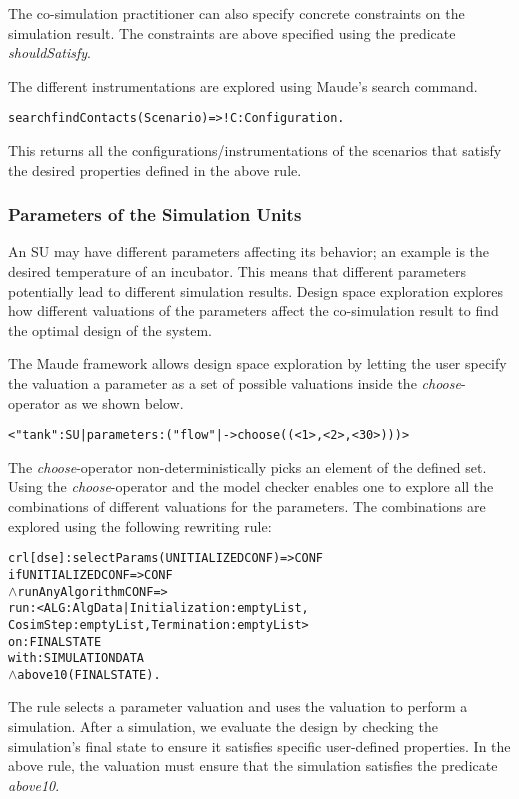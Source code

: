 The co-simulation practitioner can also specify concrete constraints on the simulation result.
The constraints are above specified using the predicate \emph{shouldSatisfy}.

The different instrumentations are explored using Maude's search command.

\begin{alltt}
  \small
  search findContacts(Scenario) =>! C:Configuration .
\end{alltt}
  
This returns all the configurations/instrumentations of the scenarios that satisfy the desired properties defined in the above rule.

\subsubsection{Parameters of the Simulation Units}
An SU may have different parameters affecting its behavior; an example is the desired temperature of an incubator.
This means that different parameters potentially lead to different simulation results.
Design space exploration explores how different valuations of the parameters affect the co-simulation result to find the optimal design of the system. 

The Maude framework allows design space exploration by letting the user specify the valuation a parameter as a set of possible valuations inside the \emph{choose}-operator as we shown below.
\begin{alltt}
  \small
< "tank" : SU | parameters : ("flow" |-> choose((< 1 >,< 2 >,< 30 >))) >
\end{alltt}

The \emph{choose}-operator non-deterministically picks an element of the defined set.
Using the \emph{choose}-operator and the model checker enables one to explore all the combinations of different valuations for the parameters.
The combinations are explored using the following rewriting rule:

\begin{alltt}
  \small
  crl [dse] : selectParams(UNITIALIZEDCONF) => CONF 
  if UNITIALIZEDCONF => CONF
  \(\land\) runAnyAlgorithm CONF => 
      run: < ALG : AlgData | Initialization : emptyList, 
      CosimStep : emptyList, Termination : emptyList > 
      on: FINALSTATE
      with: SIMULATIONDATA
  \(\land\) above10(FINALSTATE) .
\end{alltt}

The rule selects a parameter valuation and uses the valuation to perform a simulation.
After a simulation, we evaluate the design by checking the simulation's final state to ensure it satisfies specific user-defined properties.
In the above rule, the valuation must ensure that the simulation satisfies the predicate \emph{above10}.

